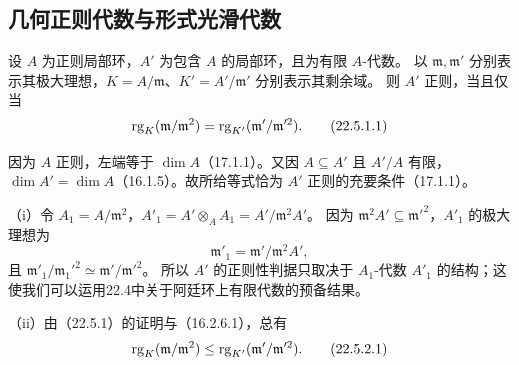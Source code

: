 \clearpage
\subsection{几何正则代数与形式光滑代数}
设 $A$ 为正则局部环，$A'$ 为包含 $A$ 的局部环，且为有限 $A$-代数。
以 $\mathfrak m,\mathfrak m'$ 分别表示其极大理想，$K=A/\mathfrak m$、$K'=A'/\mathfrak m'$ 分别表示其剩余域。
则 $A'$ 正则，当且仅当
\begin{equation}
 \operatorname{rg}_K(\mathfrak m/\mathfrak m^2)
 =\operatorname{rg}_{K'}(\mathfrak m'/\mathfrak m'^2).
 \tag{22.5.1.1}
\end{equation}

\eproof
因为 $A$ 正则，左端等于 $\dim A$（17.1.1）。又因 $A\subseteq A'$ 且 $A'/A$ 有限，
$\dim A'=\dim A$（16.1.5）。故所给等式恰为 $A'$ 正则的充要条件（17.1.1）。
\finishproof

（i）令 $A_1=A/\mathfrak m^2$，$A'_1=A'\otimes_AA_1=A'/\mathfrak m^2A'$。
因为 $\mathfrak m^2A'\subseteq\mathfrak m'^2$，$A'_1$ 的极大理想为
\[
 \mathfrak m'_1=\mathfrak m'/\mathfrak m^2A',
\]
且 $\mathfrak m'_1/\mathfrak m_1'^2\simeq\mathfrak m'/\mathfrak m'^2$。
所以 $A'$ 的正则性判据只取决于 $A_1$-代数 $A'_1$ 的结构；这使我们可以运用22.4中关于阿廷环上有限代数的预备结果。

（ii）由（22.5.1）的证明与（16.2.6.1），总有
\begin{equation}
 \operatorname{rg}_K(\mathfrak m/\mathfrak m^2)
 \le\operatorname{rg}_{K'}(\mathfrak m'/\mathfrak m'^2).
 \tag{22.5.2.1}
\end{equation}

